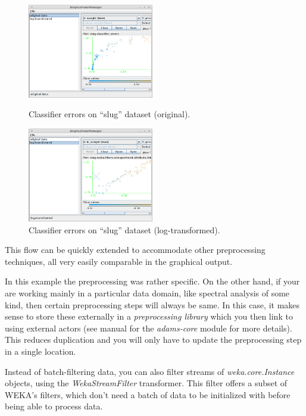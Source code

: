 \begin{figure}[ht]
  \begin{minipage}[t]{0.5\linewidth}
    \centering
    \includegraphics[width=5.5cm]{images/basic-preprocessing_errors-original.png}
    \caption{Classifier errors on ``slug'' dataset (original).}
    \label{basic-preprocessing_errors-original}
  \end{minipage}
  \hspace{0.5cm}
  \begin{minipage}[t]{0.5\linewidth}
    \centering
    \includegraphics[width=5.5cm]{images/basic-preprocessing_errors-log.png}
    \caption{Classifier errors on ``slug'' dataset (log-transformed).}
    \label{basic-preprocessing_errors-log}
  \end{minipage}
\end{figure}

This flow can be quickly extended to accommodate other preprocessing techniques,
all very easily comparable in the graphical output.

In this example the preprocessing was rather specific. On the other hand, if
your are working mainly in a particular data domain, like spectral analysis of
some kind, then certain preprocessing steps will always be same. In this case,
it makes sense to store these externally in a \textit{preprocessing library}
which you then link to using external actors (see manual for the
\textit{adams-core} module for more details). This reduces duplication and you
will only have to update the preprocessing step in a single location.

Instead of batch-filtering data, you can also filter streams of 
\textit{weka.core.Instance} objects, using the \textit{WekaStreamFilter}
transformer. This filter offers a subset of WEKA's filters, which don't need
a batch of data to be initialized with before being able to process data.

